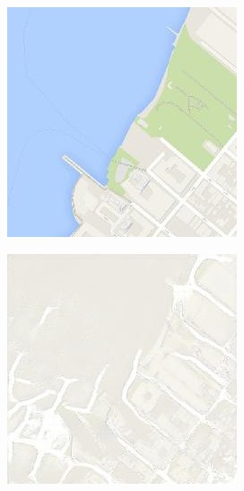 \begin{figure}[ht]
  \begin{subfigure}[t]{.14\textwidth}
    \centering
    \includegraphics[width=\linewidth]{images/cycleGanResults/Maps8_Or_Ld120_E100_Lr0002.jpg}
  \end{subfigure}
  \begin{subfigure}[t]{.14\textwidth}
    \centering
    \includegraphics[width=\linewidth]{images/cycleGanResults/Maps8_Ld120_E100_E0002.jpg}

\end{subfigure}
\end{figure}
